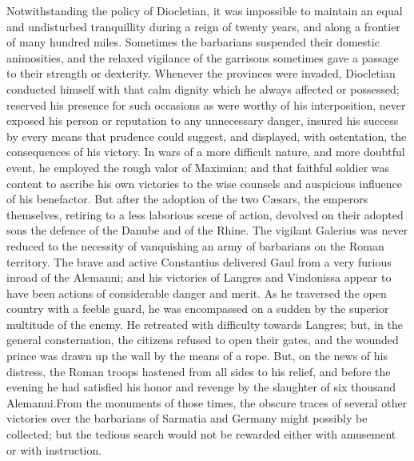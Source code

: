 
Notwithstanding the policy of Diocletian, it was impossible to
maintain an equal and undisturbed tranquillity during a reign of
twenty years, and along a frontier of many hundred miles.
Sometimes the barbarians suspended their domestic animosities,
and the relaxed vigilance of the garrisons sometimes gave a
passage to their strength or dexterity. Whenever the provinces
were invaded, Diocletian conducted himself with that calm dignity
which he always affected or possessed; reserved his presence for
such occasions as were worthy of his interposition, never exposed
his person or reputation to any unnecessary danger, insured his
success by every means that prudence could suggest, and
displayed, with ostentation, the consequences of his victory. In
wars of a more difficult nature, and more doubtful event, he
employed the rough valor of Maximian; and that faithful soldier
was content to ascribe his own victories to the wise counsels and
auspicious influence of his benefactor. But after the adoption of
the two Cæsars, the emperors themselves, retiring to a less
laborious scene of action, devolved on their adopted sons the
defence of the Danube and of the Rhine. The vigilant Galerius was
never reduced to the necessity of vanquishing an army of
barbarians on the Roman territory. \footnotemark[35] The brave and active
Constantius delivered Gaul from a very furious inroad of the
Alemanni; and his victories of Langres and Vindonissa appear to
have been actions of considerable danger and merit. As he
traversed the open country with a feeble guard, he was
encompassed on a sudden by the superior multitude of the enemy.
He retreated with difficulty towards Langres; but, in the general
consternation, the citizens refused to open their gates, and the
wounded prince was drawn up the wall by the means of a rope. But,
on the news of his distress, the Roman troops hastened from all
sides to his relief, and before the evening he had satisfied his
honor and revenge by the slaughter of six thousand Alemanni.\footnotemark[36]
From the monuments of those times, the obscure traces of several
other victories over the barbarians of Sarmatia and Germany might
possibly be collected; but the tedious search would not be
rewarded either with amusement or with instruction.

